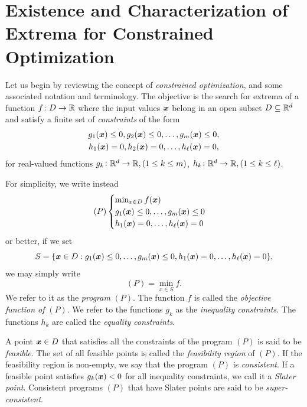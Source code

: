 
\chapter[Constrained Optimization]{Existence and Characterization of Extrema for Constrained Optimization}
\label{chapter:ConstrainedExistenceCharacterization}

Let us begin by reviewing the concept of \emph{constrained optimization}, and some associated notation and terminology.  The objective is the search for extrema of a function $f \colon D \to \mathbb{R}$ where the input values $\boldsymbol{x}$ belong in an open subset $D \subseteq \mathbb{R}^d$ and satisfy a finite set of \emph{constraints} of the form
\begin{gather*}
g_1(\boldsymbol{x}) \leq 0, g_2(\boldsymbol{x}) \leq 0, \dotsc, g_m(\boldsymbol{x}) \leq 0, \\
h_1(\boldsymbol{x}) = 0, h_2(\boldsymbol{x}) = 0, \dotsc, h_\ell(\boldsymbol{x}) = 0,
\end{gather*}
for real-valued functions $g_k\colon \mathbb{R}^d \to \mathbb{R}, (1\leq k \leq m)$, $h_k \colon \mathbb{R}^d \to \mathbb{R}, (1\leq k \leq \ell)$.

For simplicity, we write instead
\begin{equation}\label{equation:programP}
(P) \begin{cases} \min_{x\in D}f(\boldsymbol{x}) \\ g_1(\boldsymbol{x}) \leq 0, \dotsc, g_m(\boldsymbol{x}) \leq 0 \\ h_1(\boldsymbol{x}) = 0, \dotsc, h_\ell(\boldsymbol{x}) =0 \end{cases}
\end{equation}
or better, if we set 
\begin{equation*}
S = \{ \boldsymbol{x} \in D : g_1(\boldsymbol{x}) \leq 0, \dotsc, g_m(\boldsymbol{x}) \leq 0, h_1(\boldsymbol{x}) = 0, \dotsc, h_\ell(\boldsymbol{x})=0\},
\end{equation*} we may simply write 
\begin{equation*}
(P) = \min_{x\in S} f.
\end{equation*}
We refer to it as the \emph{program} $(P)$. The function $f$ is called the \emph{objective function of }$(P)$.  We refer to the functions $g_k$ as the \emph{inequality constraints}.  The functions $h_k$ are called the \emph{equality constraints}.

A point $\boldsymbol{x} \in D$ that satisfies all the constraints of the program $(P)$ is said to be \emph{feasible}.  The set of all feasible points is called the \emph{feasibility region} of $(P)$.  If the feasibility region is non-empty, we say that the program $(P)$ is \emph{consistent}. If a feasible point satisfies $g_k(\boldsymbol{x}) < 0$ for all inequality constraints, we call it a \emph{Slater point}. Consistent programs $(P)$ that have Slater points are said to be \emph{super-consistent}.


